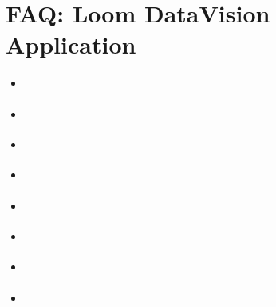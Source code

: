 \documentclass[letterpaper,10pt,english]{sphinxmanual}
\begin{document}
\chapter{FAQ: Loom DataVision Application}
\label{\detokenize{loom_trbs_faq:faq-datavision-app}}\label{\detokenize{loom_trbs_faq:faq-loom-datavision-application}}
\begin{sphinxShadowBox}
\begin{itemize}
\item {} 
\label{\detokenize{loom_trbs_faq:id31}}{\hyperref[\detokenize{loom_trbs_faq:what-is-datavision}]{}}

\item {} 
\label{\detokenize{loom_trbs_faq:id32}}{\hyperref[\detokenize{loom_trbs_faq:is-datavision-a-part-of-standard-loom-deployment}]{}}

\item {} 
\label{\detokenize{loom_trbs_faq:id33}}{\hyperref[\detokenize{loom_trbs_faq:can-i-de-install-datavision}]{}}

\item {} 
\label{\detokenize{loom_trbs_faq:id34}}{\hyperref[\detokenize{loom_trbs_faq:which-loom-services-does-datavision-application-depend-upon}]{}}

\item {} 
\label{\detokenize{loom_trbs_faq:id35}}{\hyperref[\detokenize{loom_trbs_faq:what-can-i-do-with-loom-datavision-application}]{}}

\item {} 
\label{\detokenize{loom_trbs_faq:id36}}{\hyperref[\detokenize{loom_trbs_faq:how-do-i-gain-visibility-into-cloud-based-enterprise-content-sources}]{}}

\item {} 
\label{\detokenize{loom_trbs_faq:id37}}{\hyperref[\detokenize{loom_trbs_faq:how-do-i-gain-visibility-into-enterprise-content-sources-located-on-premises}]{}}

\item {} 
\label{\detokenize{loom_trbs_faq:id38}}{\hyperref[\detokenize{loom_trbs_faq:are-there-pre-configured-data-visibility-scan-and-classification-policies}]{}}


\end{itemize}
\end{sphinxShadowBox}
\end{document}
